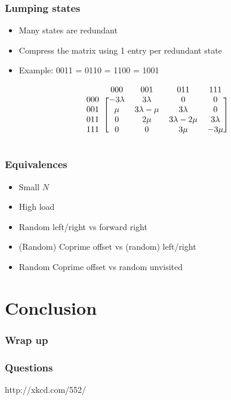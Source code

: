 \documentclass[compress]{beamer}
\begin{document}
\begin{frame}
\frametitle{Lumping states}
\begin{itemize}
 \item Many states are redundant
 \item Compress the matrix using 1 entry per redundant state
 \item Example: 0011 = 0110 = 1100 = 1001
\end{itemize}
\vspace{2em}\[\begin{blockarray}{ccccc}
    & 000 & 001 & 011 & 111 \\
    \begin{block}{c[cccc]}
    000 & -3\lambda & 3\lambda & 0 & 0 \\
    001 & \mu & 3\lambda-\mu & 3\lambda & 0 \\
    011 & 0 & 2\mu & 3\lambda-2\mu & 3\lambda \\
    111 & 0 & 0 & 3\mu & -3\mu \\
    \end{block}
\end{blockarray}\]
\end{frame}


\begin{frame}
\frametitle{Equivalences}
\begin{itemize}
 \item Small $N$
 \item High load
 \item Random left/right vs forward right
 \item (Random) Coprime offset vs (random) left/right
 \item Random Coprime offset vs random unvisited
\end{itemize}

\end{frame}

\section{Conclusion}
\begin{frame}
\frametitle{Wrap up}
\end{frame}

\begin{frame}
\frametitle{Questions}
http://xkcd.com/552/
\end{frame}
\end{document}

